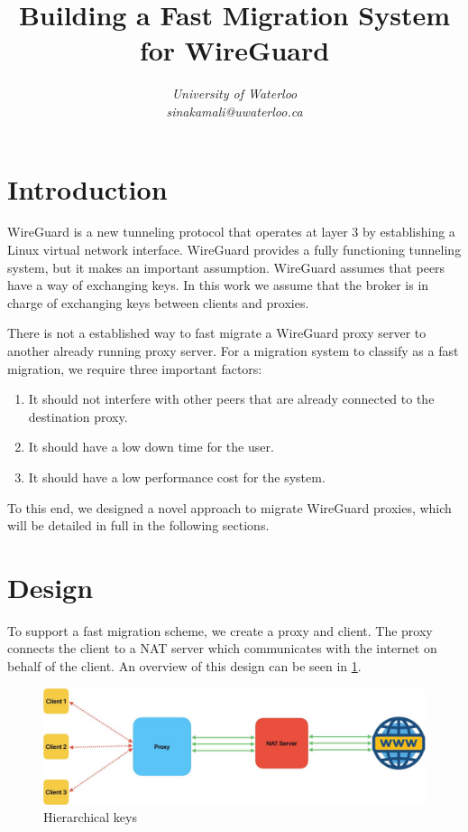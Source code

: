 \documentclass[conference]{IEEEtran}
\begin{document}
\title{Building a Fast Migration System for WireGuard}

\author{
\textit{University of Waterloo}\\
\textit{sinakamali@uwaterloo.ca}
}

\maketitle

\section{Introduction}
WireGuard \parencite[]{Donenfeld2017} is a new tunneling protocol that operates at layer 3 by establishing a Linux virtual network interface. WireGuard provides a fully functioning tunneling system, but it makes an important assumption. WireGuard assumes that peers have a way of exchanging keys. In this work we assume that the broker is in charge of exchanging keys between clients and proxies.

There is not a established way to fast migrate a WireGuard proxy server to another already running proxy server. For a migration system to classify as a fast migration, we require three important factors:

\begin{enumerate}
    \item It should not interfere with other peers that are already connected to the destination proxy.
    \item It should have a low down time for the user.
    \item It should have a low performance cost for the system.
\end{enumerate}

To this end, we designed a novel approach to migrate WireGuard proxies, which will be detailed in full in the following sections.

\section{Design}
To support a fast migration scheme, we create a proxy and client. The proxy connects the client to a NAT server which communicates with the internet on behalf of the client. An overview of this design can be seen in \ref*{fig:odesign}.

\begin{figure}[h]
    \centering
    \includegraphics[scale=0.19]{fig1.jpeg}
    \caption{Hierarchical keys}
    \label{fig:odesign}
\end{figure}
\end{document}

